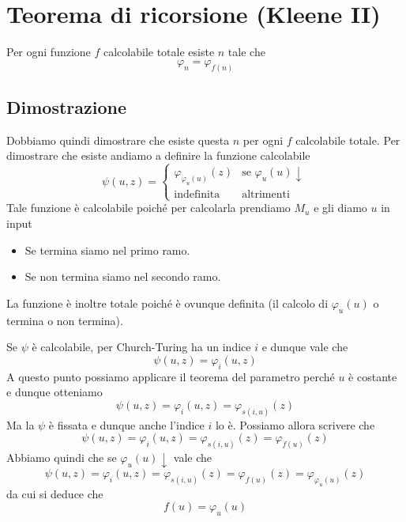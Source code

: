 \section{Teorema di ricorsione (Kleene II)}

Per ogni funzione $f$ calcolabile totale esiste $n$ tale che
\[ \varphi_n = \varphi_{f(n)} \]

\subsection{Dimostrazione}

Dobbiamo quindi dimostrare che esiste questa $n$ per ogni $f$
calcolabile totale. Per dimostrare che esiste andiamo a definire
la funzione calcolabile
\[
	\psi (u, z) = \begin{cases}
		\varphi_{\varphi_u(u)} (z) & \text{se } \varphi_u (u) \downarrow \\
		\text{indefinita}          & \text{altrimenti}
	\end{cases}
\]
Tale funzione è calcolabile poiché per calcolarla prendiamo
$M_u$ e gli diamo $u$ in input
\begin{itemize}
	\item Se termina siamo nel primo ramo.
	\item Se non termina siamo nel secondo ramo.
\end{itemize}
La funzione è inoltre totale poiché è ovunque definita (il
calcolo di $\varphi_u (u)$ o termina o non termina).

Se $\psi$ è calcolabile, per Church-Turing ha un indice $i$
e dunque vale che
\[ \psi (u, z) = \varphi_i (u, z) \]
A questo punto possiamo applicare il teorema del parametro
perché $u$ è costante e dunque otteniamo
\[ \psi (u, z) = \varphi_i (u, z) = \varphi_{s(i, u)} (z) \]
Ma la $\psi$ è fissata e dunque anche l'indice $i$ lo è. Possiamo
allora scrivere che
\[
	\psi (u, z) = \varphi_i (u, z) = \varphi_{s(i, u)} (z) =
	\varphi_{f(u)} (z)
\]
Abbiamo quindi che se $\varphi_u (u) \downarrow$ vale che
\[
	\psi (u, z) = \varphi_i (u, z) = \varphi_{s(i, u)} (z) =
	\varphi_{f(u)} (z) = \varphi_{\varphi_u(u)} (z)
\]
da cui si deduce che
\[ f(u) = \varphi_u(u) \]